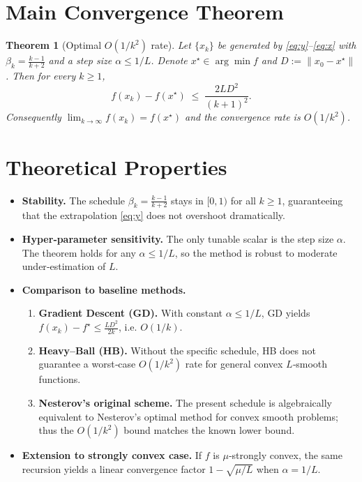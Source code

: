 \documentclass[11pt]{article}
\newtheorem{theorem}{Theorem}
\begin{document}
\section{Main Convergence Theorem}
\begin{theorem}[Optimal $O(1/k^2)$ rate]\label{thm:rate}
Let $\{x_k\}$ be generated by \eqref{eq:y}–\eqref{eq:x} with $\beta_k=\frac{k-1}{k+2}$ and a step size $\alpha\le 1/L$.  
Denote $x^\star\in\arg\min f$ and $D:=\|x_0-x^\star\|$.  
Then for every $k\ge 1$,
\[
f(x_k)-f(x^\star) \;\le\; \frac{2L D^2}{(k+1)^2}.
\]
Consequently $\displaystyle \lim_{k\to\infty} f(x_k)=f(x^\star)$ and the convergence rate is $O(1/k^2)$.
\end{theorem}

\section{Theoretical Properties}
\begin{itemize}[leftmargin=*]
\item \textbf{Stability.} The schedule $\beta_k=\frac{k-1}{k+2}$ stays in $[0,1)$ for all $k\ge 1$, guaranteeing that the extrapolation \eqref{eq:y} does not overshoot dramatically.
\item \textbf{Hyper‑parameter sensitivity.} The only tunable scalar is the step size $\alpha$. The theorem holds for any $\alpha\le 1/L$, so the method is robust to moderate under‑estimation of $L$.
\item \textbf{Comparison to baseline methods.}
    \begin{enumerate}
        \item \textbf{Gradient Descent (GD).} With constant $\alpha\le 1/L$, GD yields $f(x_k)-f^\star\le \frac{L D^2}{2k}$, i.e. $O(1/k)$.
        \item \textbf{Heavy–Ball (HB).} Without the specific schedule, HB does not guarantee a worst‑case $O(1/k^2)$ rate for general convex $L$‑smooth functions.
        \item \textbf{Nesterov’s original scheme.} The present schedule is algebraically equivalent to Nesterov’s optimal method for convex smooth problems; thus the $O(1/k^2)$ bound matches the known lower bound.
    \end{enumerate}
\item \textbf{Extension to strongly convex case.} If $f$ is $\mu$‑strongly convex, the same recursion yields a linear convergence factor $1-\sqrt{\mu/L}$ when $\alpha=1/L$.
\end{itemize}
\end{document}
